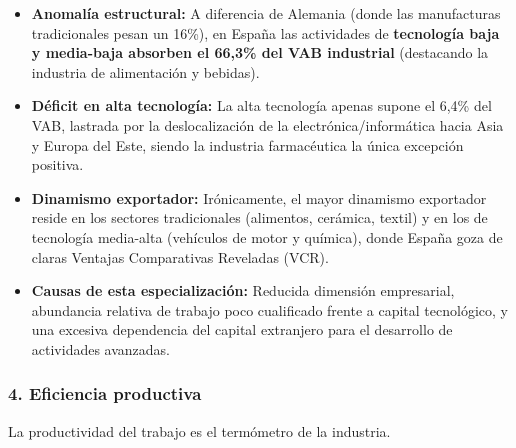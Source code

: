 \begin{itemize}
  \item \textbf{Anomalía estructural:} A diferencia de Alemania (donde las manufacturas tradicionales pesan un 16\%), en España las actividades de \textbf{tecnología baja y media-baja absorben el 66,3\% del VAB industrial} (destacando la industria de alimentación y bebidas).
  \item \textbf{Déficit en alta tecnología:} La alta tecnología apenas supone el 6,4\% del VAB, lastrada por la deslocalización de la electrónica/informática hacia Asia y Europa del Este, siendo la industria farmacéutica la única excepción positiva.
  \item \textbf{Dinamismo exportador:} Irónicamente, el mayor dinamismo exportador reside en los sectores tradicionales (alimentos, cerámica, textil) y en los de tecnología media-alta (vehículos de motor y química), donde España goza de claras Ventajas Comparativas Reveladas (VCR).
  \item \textbf{Causas de esta especialización:} Reducida dimensión empresarial, abundancia relativa de trabajo poco cualificado frente a capital tecnológico, y una excesiva dependencia del capital extranjero para el desarrollo de actividades avanzadas.
\end{itemize}

\subsubsection*{4. Eficiencia productiva}

La productividad del trabajo es el termómetro de la industria.

